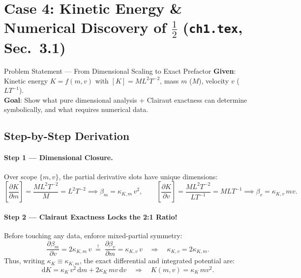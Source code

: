 \documentclass[11pt,a4paper]{article}
\newcommand{\dd}{\mathrm{d}}
\newcommand{\pd}[2]{\frac{\partial #1}{\partial #2}}
\newcommand{\dimbr}[1]{\left[#1\right]}
\begin{document}
\section{Case 4: Kinetic Energy \& Numerical Discovery of $\tfrac{1}{2}$ (\texttt{ch1.tex}, Sec.~3.1)}

\begin{setupbox}{Problem Statement — From Dimensional Scaling to Exact Prefactor}
\textbf{Given}: Kinetic energy $K = f(m, v)$ with $\dimbr{K} = ML^2T^{-2}$, mass $m$ ($M$), velocity $v$ ($LT^{-1}$).\\
\textbf{Goal}: Show what pure dimensional analysis + Clairaut exactness can determine symbolically, and what requires numerical data.
\end{setupbox}

\subsection*{Step-by-Step Derivation}

\paragraph{Step 1 — Dimensional Closure.}
Over scope $\{m, v\}$, the partial derivative slots have unique dimensions:
\[
  \dimbr{\pd{K}{m}} = \frac{ML^2T^{-2}}{M} = L^2T^{-2} \implies \beta_m = \kappa_{K,m}\,v^2,
  \qquad
  \dimbr{\pd{K}{v}} = \frac{ML^2T^{-2}}{LT^{-1}} = MLT^{-1} \implies \beta_v = \kappa_{K,v}\,mv.
\]

\paragraph{Step 2 — Clairaut Exactness Locks the 2:1 Ratio!}
Before touching any data, enforce mixed-partial symmetry:
\[
  \pd{\beta_m}{v} = 2\kappa_{K,m}\,v \;\stackrel{!}{=}\; \pd{\beta_v}{m} = \kappa_{K,v}\,v
  \quad\Longrightarrow\quad
  \kappa_{K,v} = 2\kappa_{K,m}.
\]
Thus, writing $\kappa_K \equiv \kappa_{K,m}$, the exact differential and integrated potential are:
\begin{equation}
  \dd K = \kappa_K\, v^2\,\dd m + 2\kappa_K\, m v\,\dd v
  \quad\Longrightarrow\quad
  K(m, v) = \kappa_K\, m v^2.
\end{equation}
\end{document}
